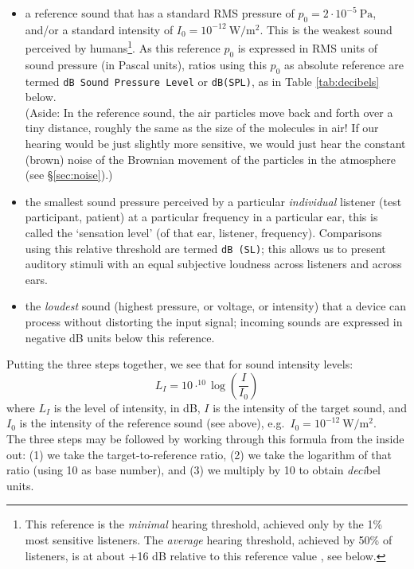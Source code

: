 \documentclass[
]{book}
\begin{document}
\begin{itemize}
\item
  a reference sound that has a standard RMS pressure of \(p_0 = 2 \cdot 10^{-5}\ \textrm{Pa}\), and/or a standard intensity of \(I_0 = 10^{-12}\ \textrm{W}/\textrm{m}^2\). This is the weakest sound perceived by humans\footnote{This reference is the \emph{minimal} hearing threshold, achieved only by the 1\% most sensitive listeners. The \emph{average} hearing threshold, achieved by 50\% of listeners, is at about +16 dB relative to this reference value \citep[Fig.96]{Fletcher_1953}, see below.}.
  As this reference \(p_0\) is expressed in RMS units of sound pressure (in Pascal units), ratios using this \(p_0\) as absolute reference are termed \texttt{dB\ Sound\ Pressure\ Level} or \texttt{dB(SPL)}, as in Table \ref{tab:decibels} below.\\
  (Aside: In the reference sound, the air particles move back and forth over a tiny distance, roughly the same as the size of the molecules in air! If our hearing would be just slightly more sensitive, we would just hear the constant (brown) noise of the Brownian movement of the particles in the atmosphere (see §\ref{sec:noise}).)
\item
  the smallest sound pressure perceived by a particular \emph{individual} listener (test participant, patient) at a particular frequency in a particular ear, this is called the `sensation level' (of that ear, listener, frequency). Comparisons using this relative threshold are termed \texttt{dB\ (SL)}; this allows us to present auditory stimuli with an equal subjective loudness across listeners and across ears.
\item
  the \emph{loudest} sound (highest pressure, or voltage, or intensity) that a device can process without distorting the input signal; incoming sounds are expressed in negative dB units below this reference.
\end{itemize}

Putting the three steps together, we see that for sound intensity levels:
\[L_I = 10 \cdot ^{10}\log \left( \frac{I}{I_0} \right)\]
where \(L_I\) is the level of intensity, in dB, \(I\) is the intensity of the target sound, and \(I_0\) is the intensity of the reference sound (see above), e.g.~\(I_0 = 10^{-12}\ \textrm{W}/\textrm{m}^2\).\\
The three steps may be followed by working through this formula from the inside out: (1) we take the target-to-reference ratio, (2) we take the logarithm of that ratio (using 10 as base number), and (3) we multiply by 10 to obtain \emph{deci}bel units.
\end{document}
